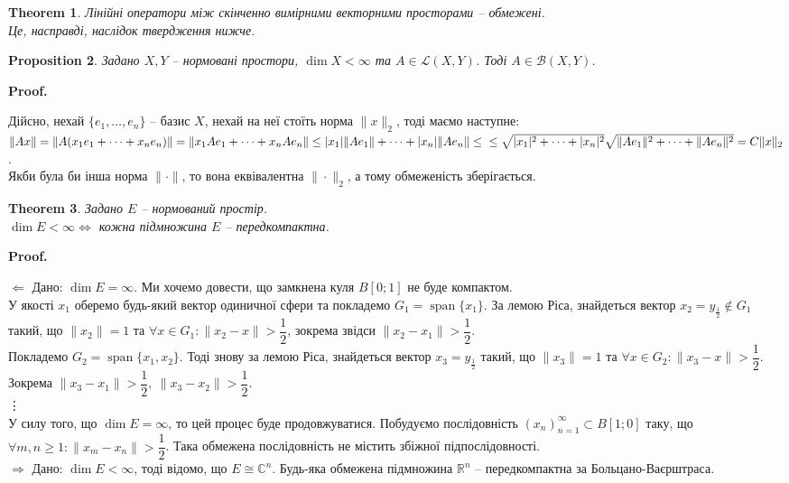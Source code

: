 \documentclass[a4paper, 10pt]{article}
\makeatletter
\def\rightproof{$\boxed{\Rightarrow}$ }
\def\leftproof{$\boxed{\Leftarrow}$ }
\theoremstyle{theoremdd}
\newtheorem{theorem}{Theorem}[subsection]
\newtheorem{proposition}[theorem]{Proposition}
\DeclareMathOperator{\linspan}{span}
\renewenvironment{proof}[1][Proof.\\]{\par
\pushQED{\hfill \qed}%
\normalfont \topsep6\p@\@plus6\p@\relax
\trivlist
\item\relax
{\bfseries
#1\@addpunct{.}}\hspace\labelsep\ignorespaces
}{%
\popQED\endtrivlist\@endpefalse
}
\makeatother
\begin{document}
\begin{theorem}
Лінійні оператори між скінченно вимірними векторними просторами -- обмежені.\\
\textit{Це, насправді, наслідок твердження нижче.}
\end{theorem}

\begin{proposition}
Задано $X,Y$ -- нормовані простори, $\dim X < \infty$ та $A \in \mathcal{L}(X,Y)$. Тоді $A \in \mathcal{B}(X,Y)$.
\end{proposition}

\begin{proof}
Дійсно, нехай $\{e_1,\dots,e_n\}$ -- базис $X$, нехай на неї стоїть норма $\|x\|_2$, тоді маємо наступне:\\
$\|Ax\| = \|A (x_1 e_1 + \dots + x_n e_n) \| = \| x_1 A e_1 + \dots + x_n A e_n \| \leq |x_1| \|A e_1 \| + \dots + |x_n| \|A e_n \| \leq \\
\leq \sqrt{|x_1|^2 + \dots + |x_n|^2} \sqrt{\|Ae_1\|^2 + \dots + \|Ae_n\|^2} = C \|x\|_2$.\\
Якби була би інша норма $\| \cdot \|$, то вона еквівалентна $\| \cdot \|_2$, а тому обмеженість зберігається.
\end{proof}

\begin{theorem}
Задано $E$ -- нормований простір.\\
$\dim E < \infty \iff$ кожна підмножина $E$ -- передкомпактна.
\end{theorem}

\begin{proof}
\leftproof Дано: $\dim E = \infty$. Ми хочемо довести, що замкнена куля $B[0;1]$ не буде компактом.\\
У якості $x_1$ оберемо будь-який вектор одиничної сфери та покладемо $G_1 = \linspan\{x_1\}$. За лемою Ріса, знайдеться вектор $x_2 = y_{\frac{1}{2}} \notin G_1$ такий, що $\|x_2\| = 1$ та $\forall x \in G_1: \|x_2-x\| > \dfrac{1}{2}$, зокрема звідси $\|x_2 - x_1\| > \dfrac{1}{2}$.\\
Покладемо $G_2 = \linspan\{x_1,x_2\}$. Тоді знову за лемою Ріса, знайдеться вектор $x_3 = y_{\frac{1}{2}}$ такий, що $\|x_3\| = 1$ та $\forall x \in G_2: \|x_3-x\| > \dfrac{1}{2}$. Зокрема $\|x_3 - x_1\| > \dfrac{1}{2},\ \|x_3 - x_2\| > \dfrac{1}{2}$.\\
\vdots \\
У силу того, що $\dim E = \infty$, то цей процес буде продовжуватися. Побудуємо послідовність $(x_n)_{n=1}^\infty \subset B[1;0]$ таку, що $\forall m,n \geq 1: \| x_m - x_n \| > \dfrac{1}{2}$. Така обмежена послідовність не містить збіжної підпослідовності.
\bigskip \\
\rightproof Дано: $\dim E < \infty$, тоді відомо, що $E \cong \mathbb{C}^n$. Будь-яка обмежена підмножина $\mathbb{R}^n$ -- передкомпактна за Больцано-Ваєрштраса.
\end{proof}
\newpage
\end{document}
